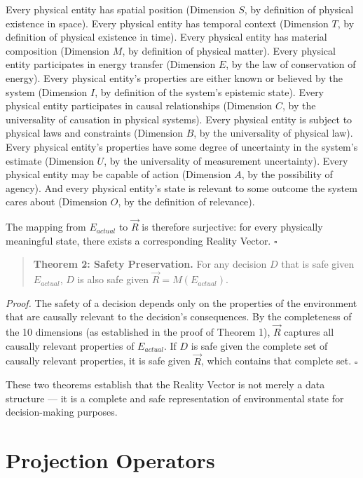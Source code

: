 \documentclass[12pt]{article}
\begin{document}
Every physical entity has spatial position (Dimension $S$, by definition of physical existence in space). Every physical entity has temporal context (Dimension $T$, by definition of physical existence in time). Every physical entity has material composition (Dimension $M$, by definition of physical matter). Every physical entity participates in energy transfer (Dimension $E$, by the law of conservation of energy). Every physical entity's properties are either known or believed by the system (Dimension $I$, by definition of the system's epistemic state). Every physical entity participates in causal relationships (Dimension $C$, by the universality of causation in physical systems). Every physical entity is subject to physical laws and constraints (Dimension $B$, by the universality of physical law). Every physical entity's properties have some degree of uncertainty in the system's estimate (Dimension $U$, by the universality of measurement uncertainty). Every physical entity may be capable of action (Dimension $A$, by the possibility of agency). And every physical entity's state is relevant to some outcome the system cares about (Dimension $O$, by the definition of relevance).

The mapping from $E_{actual}$ to $\vec{R}$ is therefore surjective: for every physically meaningful state, there exists a corresponding Reality Vector. $\square$

\begin{quote}
\textbf{Theorem 2: Safety Preservation.}
For any decision $D$ that is safe given $E_{actual}$, $D$ is also safe given $\vec{R} = M(E_{actual})$.
\end{quote}

\textit{Proof.} The safety of a decision depends only on the properties of the environment that are causally relevant to the decision's consequences. By the completeness of the 10 dimensions (as established in the proof of Theorem 1), $\vec{R}$ captures all causally relevant properties of $E_{actual}$. If $D$ is safe given the complete set of causally relevant properties, it is safe given $\vec{R}$, which contains that complete set. $\square$

These two theorems establish that the Reality Vector is not merely a data structure --- it is a complete and safe representation of environmental state for decision-making purposes.

\section{Projection Operators}
\label{sec:projection}
\end{document}
